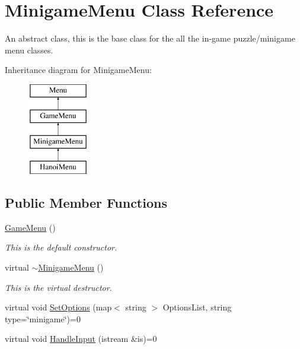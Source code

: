 \hypertarget{classMinigameMenu}{\section{Minigame\-Menu Class Reference}
\label{classMinigameMenu}
}


An abstract class, this is the base class for the all the in-\/game puzzle/minigame menu classes.  


Inheritance diagram for Minigame\-Menu\-:\begin{figure}[H]
\begin{center}
\leavevmode
\includegraphics[height=4.000000cm]{classMinigameMenu}
\end{center}
\end{figure}
\subsection*{Public Member Functions}
\begin{DoxyCompactItemize}
\item 
\hypertarget{classMinigameMenu_ae43222d43cab574372707a21bd22a2b5}{\hyperlink{classMinigameMenu_ae43222d43cab574372707a21bd22a2b5}{Game\-Menu} ()}\label{classMinigameMenu_ae43222d43cab574372707a21bd22a2b5}

\begin{DoxyCompactList}\small\item\em This is the default constructor. \end{DoxyCompactList}\item 
\hypertarget{classMinigameMenu_a6b8621ca44319d6b2759766bdca9cbf9}{virtual \hyperlink{classMinigameMenu_a6b8621ca44319d6b2759766bdca9cbf9}{$\sim$\-Minigame\-Menu} ()}\label{classMinigameMenu_a6b8621ca44319d6b2759766bdca9cbf9}

\begin{DoxyCompactList}\small\item\em This is the virtual destructor. \end{DoxyCompactList}\item 
virtual void \hyperlink{classMinigameMenu_a29820b5b338dec978b585f7a0df7b81e}{Set\-Options} (map$<$ string $>$ Options\-List, string type=\char`\"{}minigame\char`\"{})=0
\item 
virtual void \hyperlink{classMinigameMenu_a3f854c4eefb0f3110cd085b3cfe56460}{Handle\-Input} (istream \&is)=0
\end{DoxyCompactItemize}
